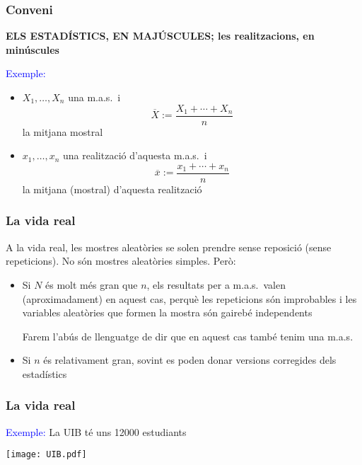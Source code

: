 \documentclass[12pt,t]{beamer}
\newcommand{\blue}[1]{\textcolor{blue}{#1}}
\renewcommand{\emph}[1]{{\color{red}#1}}
\theoremstyle{plain}
\theoremstyle{definition}
\begin{document}
\begin{frame}
\frametitle{Conveni}

\emph{\bf ELS ESTADÍSTICS, EN MAJÚSCULES; les realitzacions, en minúscules}
\medskip

\blue{Exemple:} 
\begin{itemize}
\item $X_1,\ldots,X_n$ una m.a.s.\ i 
$$
\overline{X}:=\frac{X_1+\cdots+X_n}{n}
$$
la mitjana mostral\medskip


\item $x_1,\ldots,x_n$ una realització d'aquesta m.a.s.\ i 
$$
\overline{x}:=\frac{x_1+\cdots+x_n}{n}
$$
la mitjana (mostral) d'aquesta realització
\end{itemize}

\end{frame}




\begin{frame}
\frametitle{La vida real}

A la vida real, les mostres aleatòries se solen prendre sense reposició (sense repeticions).
No són mostres aleatòries simples. Però:
\begin{itemize}
\item Si $N$ és molt més gran que $n$,  els resultats per a m.a.s.\ valen (aproximadament) en aquest cas, perquè les repeticions són improbables i les variables aleatòries que formen la mostra són gairebé independents
\smallskip

 Farem l'abús de llenguatge de dir que en aquest cas també tenim una m.a.s.
\medskip

\item Si $n$ és relativament gran, sovint es poden donar versions corregides dels estadístics
\end{itemize}

\end{frame}


\begin{frame}
\frametitle{La vida real}

\blue{Exemple:} La UIB té uns 12000 estudiants

\begin{center}
\texttt{[image: UIB.pdf]}
\end{center}

\end{frame}


%
\end{document}
